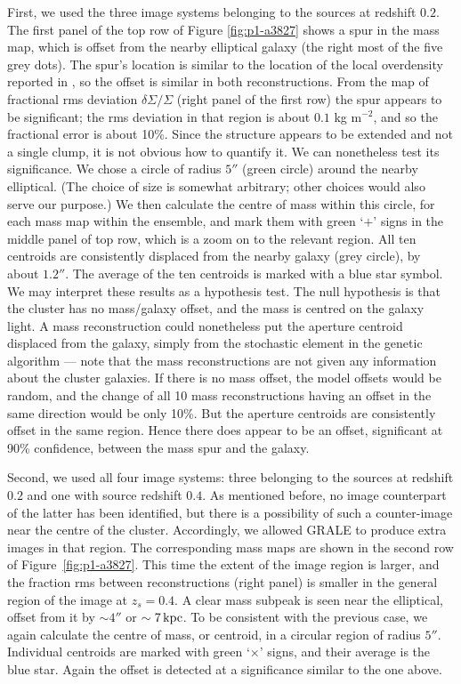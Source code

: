 \documentclass[
  11pt,
  twoside,
  openright,
  titlepage,
  headings=optiontoheadandtoc
]{scrbook}
\begin{document}
First, we used the three image systems belonging to the sources at
redshift $0.2$.  The first panel of the top row of Figure
\ref{fig:p1-a3827} shows a spur in the mass map, which is offset from the
nearby elliptical galaxy (the right most of the five grey dots). The
spur's location is similar to the location of the local overdensity
reported in \cite{2011MNRAS.415..448W}, so the offset is similar in
both reconstructions. From the map of fractional rms deviation
$\delta\Sigma/\Sigma$ (right panel of the first row) the spur appears
to be significant; the rms deviation in that region is about $0.1$ kg
m$^{-2}$, and so the fractional error is about 10\%. Since the
structure appears to be extended and not a single clump, it is not
obvious how to quantify it.  We can nonetheless test its significance.
We chose a circle of radius $5''$ (green circle) around the nearby
elliptical.  (The choice of size is somewhat arbitrary; other choices
would also serve our purpose.)  We then calculate the centre of mass
within this circle, for each mass map within the ensemble, and mark
them with green `$+$' signs in the middle panel of top row, which is a
zoom on to the relevant region.  All ten centroids are consistently
displaced from the nearby galaxy (grey circle), by about $1.2''$. The
average of the ten centroids is marked with a blue star symbol.  We
may interpret these results as a hypothesis test.  The null hypothesis
is that the cluster has no mass/galaxy offset, and the mass is centred
on the galaxy light.  A mass reconstruction could nonetheless put the
aperture centroid displaced from the galaxy, simply from the
stochastic element in the genetic algorithm --- note that the mass
reconstructions are not given any information about the cluster
galaxies.  If there is no mass offset, the model offsets would be
random, and the change of all 10 mass reconstructions having an offset
in the same direction would be only 10\%.  But the aperture centroids
are consistently offset in the same region.  Hence there does appear
to be an offset, significant at 90\% confidence, between the mass spur
and the galaxy.

Second, we used all four image systems: three belonging to the sources
at redshift $0.2$ and one with source redshift $0.4$. As mentioned
before, no image counterpart of the latter has been identified, but
there is a possibility of such a counter-image near the centre of the
cluster.  Accordingly, we allowed GRALE to produce extra images in
that region.  The corresponding mass maps are shown in the second row
of Figure~\ref{fig:p1-a3827}. This time the extent of the image region is
larger, and the fraction rms between reconstructions (right panel) is smaller
in the general region of the image at $z_s=0.4$.  A clear mass subpeak
is seen near the elliptical, offset from it by $\sim4''$ or $\sim 7
\rm\,kpc$.  To be consistent with the previous case, we again
calculate the centre of mass, or centroid, in a circular region of
radius $5''$.  Individual centroids are marked with green `$\times$'
signs, and their average is the blue star. Again the offset is detected
at a significance similar to the one above.
\end{document}
